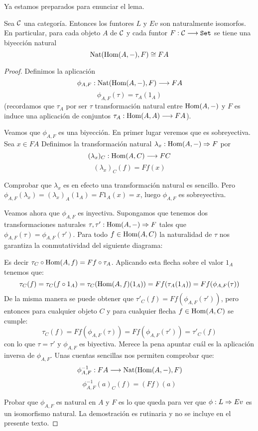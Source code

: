 Ya estamos preparados para enunciar el lema.
\begin{theorem}
  Sea $\mathcal{C}$ una categoría. Entonces los funtores $L$ y $Ev$ son naturalmente isomorfos.
  En particular, para cada objeto $A$ de $\mathcal{C}$ y cada funtor $F : \mathcal{C}\longrightarrow \texttt{Set}$
  se tiene una biyección natural
  $$\operatorname{Nat}(\operatorname{Hom}(A, -), F) \cong FA$$
\end{theorem}
\begin{proof}
  Definimos la aplicación
  $$\phi_{A, F} : \operatorname{Nat}(\operatorname{Hom}(A, -), F)\longrightarrow FA$$
  $$\phi_{A, F}(\tau) = \tau_A (1_A)$$
  (recordamos que $\tau_A$ por ser $\tau$ transformación natural entre $\operatorname{Hom}(A, -)$ y $F$ es
  induce una aplicación de conjuntos $\tau_A : \operatorname{Hom}(A, A)\longrightarrow F A$).

  Veamos que $\phi_{A, F}$ es una biyección. En primer lugar veremos que es sobreyectiva. Sea $x \in FA$
  Definimos la transformación natural $\lambda_x : \operatorname{Hom}(A, -)\Rightarrow F$ por
  $$(\lambda_x)_C : \operatorname{Hom}(A, C)\longrightarrow F C$$
  $$(\lambda_x)_C(f) = Ff(x)$$

  Comprobar que $\lambda_x$ es en efecto una transformación natural es sencillo. Pero
  $\phi_{A, F}(\lambda_x) = (\lambda_x)_A (1_A) = F1_A(x) = x$, luego $\phi_{A, F}$
  es sobreyectiva.

  Veamos ahora que $\phi_{A, F}$ es inyectiva. Supongamos que tenemos
  dos transformaciones naturales $\tau, \tau' : \operatorname{Hom}(A, -)\Rightarrow F$
  tales que $\phi_{A, F}(\tau) = \phi_{A, F}(\tau')$. Para todo $f \in \operatorname{Hom}(A, C)$
  la naturalidad de $\tau$ nos garantiza la conmutatividad
  del siguiente diagrama:
  \begin{center}
  \end{center}


  Es decir $\tau_C \circ \operatorname{Hom}(A, f) = F f \circ \tau_A$. Aplicando
  esta flecha sobre el valor $1_A$ tenemos que:
$$\tau_C(f) = \tau_C(f \circ 1_A) = \tau_C(\operatorname{Hom}(A, f)(1_A)) = F f(\tau_A(1_A)) = Ff(\phi_{A, F}(\tau))$$
  De la misma manera se puede obtener que $\tau'_C(f)  = Ff(\phi_{A, F}(\tau'))$, pero entonces para cualquier objeto $C$ y para cualquier flecha $f \in \operatorname{Hom}(A, C)$
  se cumple:
  $$\tau_C(f) = Ff (\phi_{A,F}(\tau)) = Ff(\phi_{A, F}(\tau')) = \tau'_C(f)$$
  con lo que $\tau = \tau'$ y $\phi_{A, F}$ es biyectiva.
  Merece la pena apuntar cuál es la aplicación inversa de $\phi_{A, F}$.
  Unas cuentas sencillas nos permiten comprobar que:
  $$\phi_{A,F}^{-1} : FA\longrightarrow \operatorname{Nat}(\operatorname{Hom}(A, -), F)$$
  $$\phi_{A,F}^{-1}(a)_C(f) = (Ff)(a)$$

  Probar que $\phi_{A, F}$ es natural en $A$ y $F$ es lo que queda para ver
  que $\phi : L\Rightarrow Ev$ es un isomorfismo natural. La demostración es
  rutinaria y no se incluye en el presente texto.
\end{proof}

